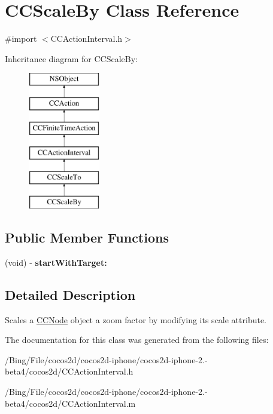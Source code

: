 \hypertarget{interface_c_c_scale_by}{\section{C\-C\-Scale\-By Class Reference}
\label{interface_c_c_scale_by}
}


{\ttfamily \#import $<$C\-C\-Action\-Interval.\-h$>$}

Inheritance diagram for C\-C\-Scale\-By\-:\begin{figure}[H]
\begin{center}
\leavevmode
\includegraphics[height=6.000000cm]{interface_c_c_scale_by}
\end{center}
\end{figure}
\subsection*{Public Member Functions}
\begin{DoxyCompactItemize}
\item 
\hypertarget{interface_c_c_scale_by_a18aa7e01e27775b171dfffb7cd559037}{(void) -\/ {\bfseries start\-With\-Target\-:}}\label{interface_c_c_scale_by_a18aa7e01e27775b171dfffb7cd559037}

\end{DoxyCompactItemize}


\subsection{Detailed Description}
Scales a \hyperlink{class_c_c_node}{C\-C\-Node} object a zoom factor by modifying its scale attribute. 

The documentation for this class was generated from the following files\-:\begin{DoxyCompactItemize}
\item 
/\-Bing/\-File/cocos2d/cocos2d-\/iphone/cocos2d-\/iphone-\/2.-\/beta4/cocos2d/C\-C\-Action\-Interval.\-h\item 
/\-Bing/\-File/cocos2d/cocos2d-\/iphone/cocos2d-\/iphone-\/2.-\/beta4/cocos2d/C\-C\-Action\-Interval.\-m\end{DoxyCompactItemize}

